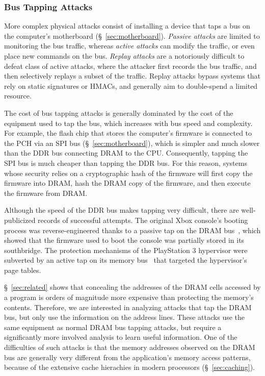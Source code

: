 \subsubsection{Bus Tapping Attacks}
\label{sec:physical_bus_attacks}

More complex physical attacks consist of installing a device that taps a bus on
the computer's motherboard (\S~\ref{sec:motherboard}). \textit{Passive attacks}
are limited to monitoring the bus traffic, whereas \textit{active attacks} can
modify the traffic, or even place new commands on the bus. \textit{Replay
attacks} are a notoriously difficult to defeat class of active attacks, where
the attacker first records the bus traffic, and then selectively replays a
subset of the traffic. Replay attacks bypass systems that rely on static
signatures or HMACs, and generally aim to double-spend a limited resource.

The cost of bus tapping attacks is generally dominated by the cost of the
equipment used to tap the bus, which increases with bus speed and complexity.
For example, the flash chip that stores the computer's firmware is connected to
the PCH via an SPI bus (\S~\ref{sec:motherboard}), which is simpler and much
slower than the DDR bus connecting DRAM to the CPU. Consequently, tapping the
SPI bus is much cheaper than tapping the DDR bus. For this reason, systems
whose security relies on a cryptographic hash of the firmware will first copy
the firmware into DRAM, hash the DRAM copy of the firmware, and then execute
the firmware from DRAM.

Although the speed of the DDR bus makes tapping very difficult, there are
well-publicized records of successful attempts. The original Xbox console's
booting process was reverse-engineered thanks to a passive tap on the DRAM
bus~\cite{huang2003xbox}, which showed that the firmware used to boot the
console was partially stored in its southbridge. The protection mechanisms of
the PlayStation 3 hypervisor were subverted by an active tap on its memory
bus~\cite{hotz2010ps3} that targeted the hypervisor's page tables.

\S~\ref{sec:related} shows that concealing the addresses of the DRAM cells
accessed by a program is orders of magnitude more expensive than protecting the
memory's contents. Therefore, we are interested in analyzing attacks that tap
the DRAM bus, but only use the information on the address lines. These attacks
use the same equipment as normal DRAM bus tapping attacks, but require a
significantly more involved analysis to learn useful information. One of the
difficulties of such attacks is that the memory addresses observed on the DRAM
bus are generally very different from the application's memory access patterns,
because of the extensive cache hierachies in modern processors
(\S~\ref{sec:caching}).


